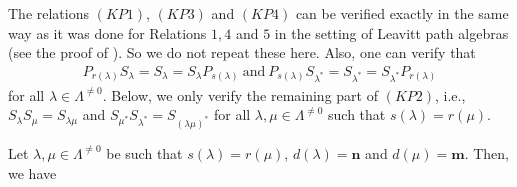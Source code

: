 \documentclass[12pt]{amsart}
\newcommand{\N}{\mathbf{n}}
\newcommand{\M}{\mathbf{m}}
\theoremstyle{definition}
\theoremstyle{remark}
\begin{document}
The relations $(KP1)$, $(KP3)$ and $(KP4)$ can be verified exactly in the same way as it was done for Relations $1,4$ and $5$ in the setting of Leavitt path algebras (see the proof of \cite[Theorem 4.11]{ART}). So we do not repeat these here. Also, one can verify that 
\begin{align*}
    P_{r(\lambda)}S_\lambda=S_\lambda=S_\lambda P_{s(\lambda)} ~\text{and}~
    P_{s(\lambda)}S_{\lambda^*}=S_{\lambda^*}=S_{\lambda^*} P_{r(\lambda)}
\end{align*}
for all $\lambda\in \Lambda^{\neq 0}$. Below, we only verify the remaining part of $(KP2)$, i.e., $S_\lambda S_\mu=S_{\lambda\mu}$ and $S_{\mu^*}S_{\lambda^*}=S_{(\lambda\mu)^*}$ for all $\lambda,\mu\in \Lambda^{\neq 0}$ such that $s(\lambda)=r(\mu)$. 

Let $\lambda,\mu\in \Lambda^{\neq 0}$ be such that $s(\lambda)=r(\mu)$, $d(\lambda)=\N$ and $d(\mu)=\M$. Then, we have
\end{document}
